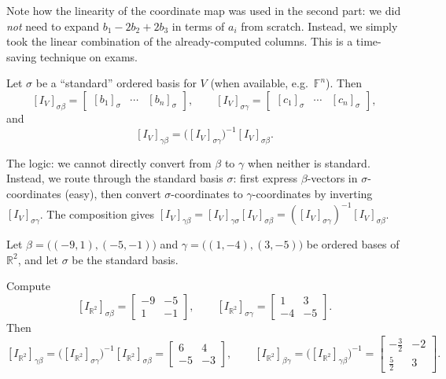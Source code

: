 Note how the linearity of the coordinate map was used in the second part: we did \emph{not} need to expand $b_1-2b_2+2b_3$ in terms of $a_i$ from scratch.
Instead, we simply took the linear combination of the already-computed columns.
This is a time-saving technique on exams.

\begin{keyformula}[title={Key Formula: computing $[I_V]_{\gamma\beta}$ via a standard basis}]
Let $\sigma$ be a ``standard'' ordered basis for $V$ (when available, e.g.\ $\mathbb{F}^n$).
Then
\[
[I_V]_{\sigma\beta}=\begin{bmatrix}[b_1]_\sigma&\cdots&[b_n]_\sigma\end{bmatrix},
\qquad
[I_V]_{\sigma\gamma}=\begin{bmatrix}[c_1]_\sigma&\cdots&[c_n]_\sigma\end{bmatrix},
\]
and
\[
[I_V]_{\gamma\beta}=\bigl([I_V]_{\sigma\gamma}\bigr)^{-1}[I_V]_{\sigma\beta}.
\]
\end{keyformula}

The logic: we cannot directly convert from $\beta$ to $\gamma$ when neither is standard.
Instead, we route through the standard basis $\sigma$: first express $\beta$-vectors in $\sigma$-coordinates (easy), then convert $\sigma$-coordinates to $\gamma$-coordinates by inverting $[I_V]_{\sigma\gamma}$.
The composition gives $[I_V]_{\gamma\beta}=[I_V]_{\gamma\sigma}[I_V]_{\sigma\beta}=([I_V]_{\sigma\gamma})^{-1}[I_V]_{\sigma\beta}$.

\begin{examplebox}[title={Worked Example (Lecture Week 7): change of basis in $\mathbb{R}^2$}]
Let $\beta=\bigl((-9,1),(-5,-1)\bigr)$ and $\gamma=\bigl((1,-4),(3,-5)\bigr)$ be ordered bases of $\mathbb{R}^2$,
and let $\sigma$ be the standard basis.

Compute
\[
[I_{\mathbb{R}^2}]_{\sigma\beta}
=
\begin{bmatrix}
-9 & -5\\
1 & -1
\end{bmatrix},
\qquad
[I_{\mathbb{R}^2}]_{\sigma\gamma}
=
\begin{bmatrix}
1 & 3\\
-4 & -5
\end{bmatrix}.
\]
Then
\[
[I_{\mathbb{R}^2}]_{\gamma\beta}
=
\bigl([I_{\mathbb{R}^2}]_{\sigma\gamma}\bigr)^{-1}[I_{\mathbb{R}^2}]_{\sigma\beta}
=
\begin{bmatrix}
6 & 4\\
-5 & -3
\end{bmatrix},
\qquad
[I_{\mathbb{R}^2}]_{\beta\gamma}
=
\bigl([I_{\mathbb{R}^2}]_{\gamma\beta}\bigr)^{-1}
=
\begin{bmatrix}
-\tfrac{3}{2} & -2\\
\tfrac{5}{2} & 3
\end{bmatrix}.
\]
\end{examplebox}

